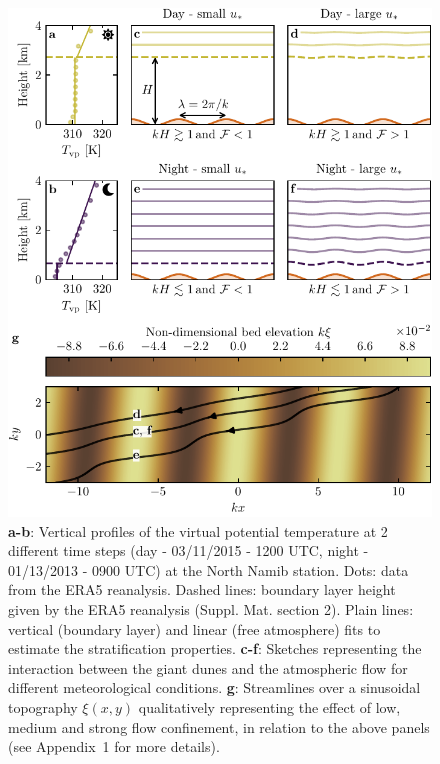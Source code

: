 \begin{figure}
\centering
\includegraphics[scale=1]{Figures/Figure4.pdf}
\caption{\textbf{a-b}: Vertical profiles of the virtual potential temperature at 2 different time steps (day - 03/11/2015 - 1200 UTC, night - 01/13/2013 - 0900 UTC) at the North Namib station. Dots: data from the ERA5 reanalysis. Dashed lines: boundary layer height given by the ERA5 reanalysis (Suppl. Mat. section 2). Plain lines: vertical (boundary layer) and linear (free atmosphere) fits to estimate the stratification properties. \textbf{c-f}: Sketches representing the interaction between the giant dunes and the atmospheric flow for different meteorological conditions. \textbf{g}: Streamlines over a sinusoidal topography $\xi(x,y)$ qualitatively representing the effect of low, medium and strong flow confinement, in relation to the above panels (see Appendix~1 for more details). }
\label{Fig4}
\end{figure}


